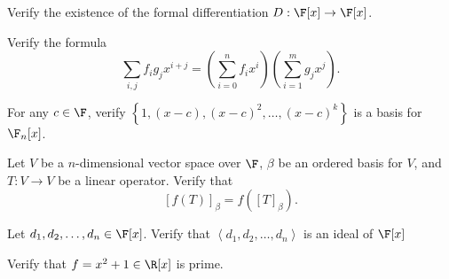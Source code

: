 \documentclass[math_245.tex]{subfiles}
\begin{document}

    \begin{exercise}
        Verify the existence of the formal differentiation $D: \F[x]\to \F[x]$.
    \end{exercise}

    \begin{exercise}
        Verify the formula
        \begin{equation*}
            \sum_{i,j} f_ig_jx^{i+j} = \left( \sum^n_{i=0}f_ix^i \right) \left( \sum^m_{i=1} g_jx^j \right).
        \end{equation*}
    \end{exercise}

    \begin{exercise}
        For any $c\in \F$, verify $\left\lbrace 1, (x-c), (x-c)^2, \ldots, (x-c)^k \right\rbrace$ is a basis for $\F_n[x]$.
    \end{exercise}

    \begin{exercise}
        Let $V$ be a $n$-dimensional vector space over $\F$, $\beta$ be an ordered basis for $V$, and $T:V\to V$ be a linear operator. Verify that
        \begin{equation*}
            \left[ f(T) \right]_\beta = f \left( \left[ T \right]_\beta \right).         
        \end{equation*}
    \end{exercise}

    \begin{exercise}
        Let $d_1, d_2, \ldots, d_n\in \F[x]$. Verify that $\left<d_1, d_2, \ldots, d_n\right>$ is an ideal of $\F[x]$
    \end{exercise}

    \begin{exercise}
        Verify that $f = x^2 + 1\in \R[x]$ is prime.
    \end{exercise}
\end{document}
